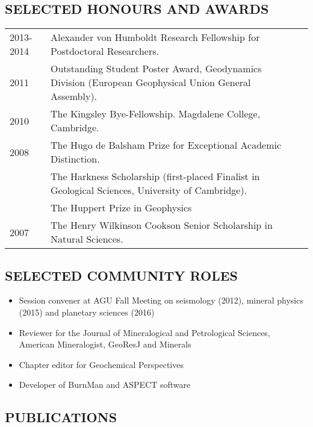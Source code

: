\documentclass[11pt,twoside,a4paper]{article}
\begin{document}
\subsection*{SELECTED HONOURS AND AWARDS}

\vspace{-0.5em}
\begin{table}[!h]
\centering
\begin{tabular}{L{2cm} L{13cm} L{2cm}}
2013-2014 & Alexander von Humboldt Research Fellowship for Postdoctoral Researchers. & \\
2011 & Outstanding Student Poster Award, Geodynamics Division (European Geophysical Union General Assembly). & \\
2010 & The Kingsley Bye-Fellowship. Magdalene College, Cambridge. & \\
2008 & The Hugo de Balsham Prize for Exceptional Academic Distinction. & \\
 & The Harkness Scholarship (first-placed Finalist in Geological Sciences, University of Cambridge). & \\
 & The Huppert Prize in Geophysics &  \\
2007 & The Henry Wilkinson Cookson Senior Scholarship in Natural Sciences. &
\end{tabular}
\end{table}

\vspace{-1.5em}

  
\subsection*{SELECTED COMMUNITY ROLES}
\begin{itemize}
\item Session convener at AGU Fall Meeting on seismology (2012), mineral physics (2015) and planetary sciences (2016)
\item Reviewer for the Journal of Mineralogical and Petrological Sciences, American Mineralogist, GeoResJ and Minerals
\item Chapter editor for Geochemical Perspectives
\item Developer of BurnMan and ASPECT software
\end{itemize}

\clearpage
\subsection*{PUBLICATIONS}
\end{document}
